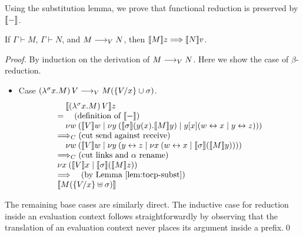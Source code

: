 \documentclass[oribibl,orivec,envcountsame]{llncs}
\begin{document}

Using the substitution lemma, we prove that functional reduction is preserved by $\tocp{-}$.
%
\begin{theorem}
\label{th:teval-preserved}
If $\Gamma \vdash M$, $\Gamma \vdash N$, and $M \teval N$, then $\tocp{M}z
\bigrto \tocp{N}v$.
\end{theorem}
%
\begin{proof}
By induction on the derivation of $M \teval N$. Here we show the case of $\beta$-reduction.
\begin{itemize}
\item Case $(\lambda^\sigma x.M)\,V \teval M(\{\bind x V\} \cup \sigma)$.
\[
\bl
\quad \tocp{(\lambda^\sigma x.M)\,V}z \\
= \quad (\text{definition of }\tocp{-}) \\
\quad \cut{w}{}{\tocp{V}w}{\cut{y}{}{\tocp{\sigma}(y(x).\tocp{M}y)}{y[x](\link{w}{x} \mid \link{y}{z})}} \\
\bigcrto (\text{cut send against receive}) \\
\quad \cut{w}{}{\tocp{V}w}{\cut{y}{}{\link{y}{z}}{\cut{x}{}{\link{w}{x}}{\tocp{\sigma}(\tocp{M}y)}}} \\
\bigcrto (\text{cut links and $\alpha$ rename}) \\
\cut{x}{}{\tocp{V}x}{\tocp{\sigma}(\tocp{M}z)} \\
\bigrto \quad (\text{by Lemma~\ref{lem:tocp-subst}}) \\
\tocp{M(\{\bind x V\} \uplus \sigma)}
\el
\]
\end{itemize}
The remaining base cases are similarly direct. The inductive case for reduction inside an evaluation
context follows straightforwardly by observing that the translation of an evaluation context never
places its argument inside a prefix.\qed
\end{proof}
\end{document}
